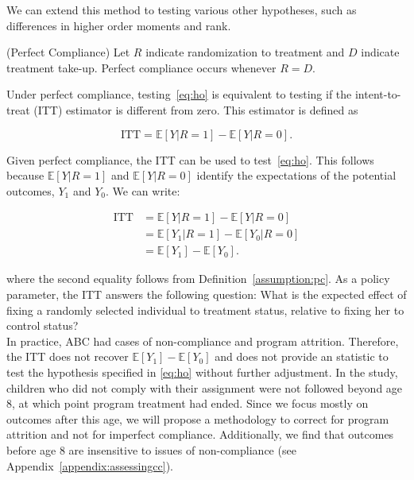 \noindent We can extend this method to testing various other hypotheses, such as differences in higher order moments and rank.

\noindent \begin{definition} \label{assumption:pc} \normalfont (Perfect Compliance) Let $R$ indicate randomization to treatment and $D$ indicate treatment take-up. Perfect compliance occurs whenever  $R = D$.\end{definition}

\noindent Under perfect compliance, testing~\eqref{eq:ho} is equivalent to testing if the intent-to-treat (ITT) estimator is different from zero. This estimator is defined as 

\begin{equation}
\text{ITT} = \mathbb{E} \left[ Y | R = 1 \right] - \mathbb{E} \left[ Y | R = 0 \right]. \label{eq:itt}
\end{equation} 

\noindent Given perfect compliance, the ITT can be used to test~\eqref{eq:ho}. This follows because $\mathbb{E} \left[ Y | R = 1 \right]$ and $\mathbb{E} \left[ Y | R = 0 \right]$ identify the expectations of the potential outcomes, $Y_{1}$ and $Y_{0}$. We can write: 

\begin{align}
\text{ITT} &= \mathbb{E} \left[ Y | R = 1 \right] - \mathbb{E} \left[ Y | R = 0 \right] \nonumber \\
	       &= \mathbb{E} \left[ Y_{1} | R = 1 \right] - \mathbb{E} \left[ Y_{0} | R = 0 \right] \nonumber \\
	       &= \mathbb{E} \left[ Y_{1} \right] - \mathbb{E} \left[ Y_{0} \right].
\end{align} 

\noindent where the second equality follows from Definition~\ref{assumption:pc}. As a policy parameter, the ITT answers the following question: What is the expected effect of fixing a randomly selected individual to treatment status, relative to fixing her to control status?\\

\noindent In practice, ABC had cases of non-compliance and program attrition. Therefore, the ITT does not recover $ \mathbb{E} \left[ Y_{1} \right] - \mathbb{E} \left[ Y_{0} \right] $ and does not provide an statistic to test the hypothesis specified in \eqref{eq:ho} without further adjustment. In the study, children who did not comply with their assignment were not followed beyond age 8, at which point program treatment had ended. Since we focus mostly on outcomes after this age, we will propose a methodology to correct for program attrition and not for imperfect compliance. Additionally, we find that outcomes before age 8 are insensitive to issues of non-compliance (see Appendix~\ref{appendix:assessingcc}).\\

